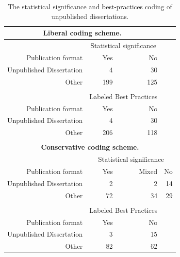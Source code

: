 \documentclass[man, mask]{apa6}
\begin{document}
\begin{table}[htbp]
	\centering
	\caption{The statistical significance and best-practices coding of unpublished dissertations.}
	\begin{tabular}{rrrr}
		\toprule
		\multicolumn{3}{c}{\textbf{Liberal coding scheme.}} &  \\
		\midrule
		& \multicolumn{2}{c}{Statistical significance} &  \\
		Publication format & Yes   & No    &  \\
		Unpublished Dissertation & 4     & 30    &  \\
		Other & 199   & 125   &  \\
		&       &       &  \\
		& \multicolumn{2}{c}{Labeled Best Practices} &  \\
		Publication format & Yes   & No    &  \\
		Unpublished Dissertation & 4     & 30    &  \\
		Other & 206   & 118   &  \\
		&       &       &  \\
		\multicolumn{4}{c}{\textbf{Conservative coding scheme.}} \\
		& \multicolumn{3}{c}{Statistical significance} \\
		Publication format & Yes   & Mixed & No \\
		Unpublished Dissertation & 2     & 2     & 14 \\
		Other & 72    & 34    & 29 \\
		&       &       &  \\
		& \multicolumn{2}{c}{Labeled Best Practices} &  \\
		Publication format & Yes   & No    &  \\
		Unpublished Dissertation & 3     & 15    &  \\
		Other & 82    & 62    &  \\
		\bottomrule
	\end{tabular}%
	\label{table:dissertations}%
\end{table}
\end{document}
